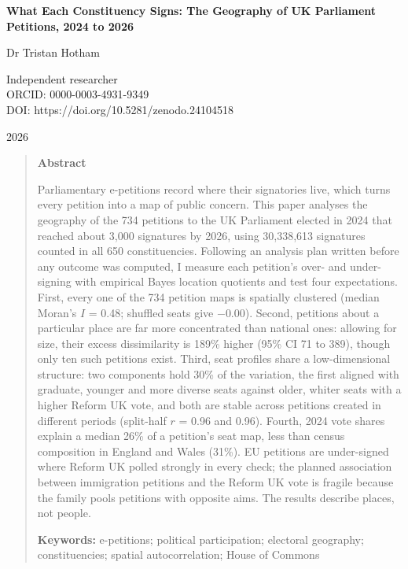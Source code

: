 \documentclass[11pt,a4paper]{article}
\begin{document}
\begin{center}
{\Large\bfseries What Each Constituency Signs: The Geography of UK Parliament Petitions, 2024 to 2026\par}
\vspace{1.2em}
{\large Dr Tristan Hotham\par}
\vspace{0.3em}
{\small Independent researcher\\
ORCID: 0000-0003-4931-9349\\
DOI: https://doi.org/10.5281/zenodo.24104518\par}
\vspace{0.8em}
2026
\end{center}

\begin{quote}
\small
\begin{center}\textbf{Abstract}\end{center}
Parliamentary e-petitions record where their signatories live, which turns every petition into a map of public concern. This paper analyses the geography of the 734 petitions to the UK Parliament elected in 2024 that reached about 3,000 signatures by 2026, using 30,338,613 signatures counted in all 650 constituencies. Following an analysis plan written before any outcome was computed, I measure each petition's over- and under-signing with empirical Bayes location quotients and test four expectations. First, every one of the 734 petition maps is spatially clustered (median Moran's $I$ = 0.48; shuffled seats give $-$0.00). Second, petitions about a particular place are far more concentrated than national ones: allowing for size, their excess dissimilarity is 189\% higher (95\% CI 71 to 389), though only ten such petitions exist. Third, seat profiles share a low-dimensional structure: two components hold 30\% of the variation, the first aligned with graduate, younger and more diverse seats against older, whiter seats with a higher Reform UK vote, and both are stable across petitions created in different periods (split-half $r$ = 0.96 and 0.96). Fourth, 2024 vote shares explain a median 26\% of a petition's seat map, less than census composition in England and Wales (31\%). EU petitions are under-signed where Reform UK polled strongly in every check; the planned association between immigration petitions and the Reform UK vote is fragile because the family pools petitions with opposite aims. The results describe places, not people.

\textbf{Keywords:} e-petitions; political participation; electoral geography; constituencies; spatial autocorrelation; House of Commons
\end{quote}
\end{document}
